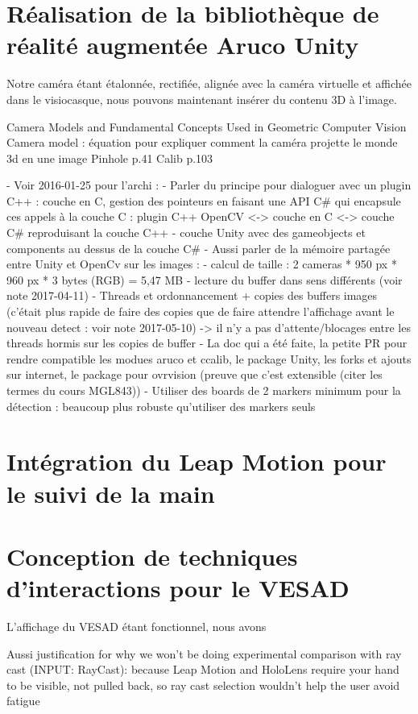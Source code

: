 \section{Réalisation de la bibliothèque de réalité augmentée Aruco Unity}
\label{sec:aruco_unity}

Notre caméra étant étalonnée, rectifiée, alignée avec la caméra virtuelle et affichée dans le visiocasque, nous pouvons maintenant insérer du contenu 3D à l'image.

Camera Models and Fundamental Concepts Used in Geometric Computer Vision
Camera model : équation pour expliquer comment la caméra projette le monde 3d en une image
Pinhole p.41
Calib p.103

- Voir 2016-01-25 pour l'archi :
  - Parler du principe pour dialoguer avec un plugin C++ : couche en C, gestion des pointeurs en faisant une API C\# qui encapsule ces appels à la couche C : plugin C++ OpenCV <-> couche en C <-> couche C\# reproduisant la couche C++ 
  - couche Unity avec des gameobjects et components au dessus de la couche C\#
- Aussi parler de la mémoire partagée entre Unity et OpenCv sur les images :
  - calcul de taille : 2 cameras * 950 px * 960 px * 3 bytes (RGB) = 5,47 MB
  - lecture du buffer dans sens différents (voir note 2017-04-11)
  - Threads et ordonnancement + copies des buffers images (c'était plus rapide de faire des copies que de faire attendre l'affichage avant le nouveau detect : voir note 2017-05-10) -> il n'y a pas d'attente/blocages entre les threads hormis sur les copies de buffer
- La doc qui a été faite, la petite PR pour rendre compatible les modues aruco et ccalib, le package Unity, les forks et ajouts sur internet, le package pour ovrvision (preuve que c'est extensible (citer les termes du cours MGL843))
- Utiliser des boards de 2 markers minimum pour la détection : beaucoup plus robuste qu'utiliser des markers seuls


\section{Intégration du Leap Motion pour le suivi de la main}
\label{sec:hand_tracking}


\section{Conception de techniques d'interactions pour le VESAD}
\label{sec:interaction_techniques}
L'affichage du VESAD étant fonctionnel, nous avons 

Aussi justification for why we won’t be doing experimental comparison with ray cast (INPUT: RayCast): because Leap Motion and HoloLens require your hand to be visible, not pulled back, so ray cast selection wouldn’t help the user avoid fatigue

